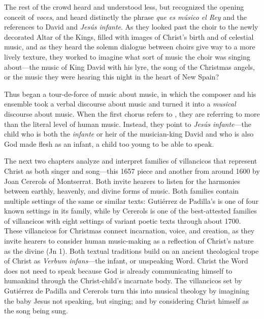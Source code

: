 The rest of the crowd heard and understood less, but recognized the opening
conceit of \emph{voces}, and heard distinctly the phrase \emph{que es músico el
Rey} and the references to David and \emph{Jesús infante}.
As they looked past the choir to the newly decorated Altar of the Kings, filled
with images of Christ's birth and of celestial music, and as they heard the
solemn dialogue between choirs give way to a more lively texture, they worked
to imagine what sort of music the choir was singing about---the music of King
David with his lyre, the song of the Christmas angels, or the music they were
hearing this night in the heart of New Spain?

Thus began a tour-de-force of music about music, in which the composer and his
ensemble took a verbal discourse about music and turned it into a
\emph{musical} discourse about music.
When the first chorus refers to , they are referring to
more than the literal level of human music.
Instead, they point to \emph{Jesús infante}---the child who is both the
\emph{infante} or heir of the musician-king David and who is also God made
flesh as an infant, a child too young to be able to speak.

The next two chapters analyze and interpret families of villancicos that
represent Christ as both singer and song---this 1657 piece and another from
around 1600 by Joan Cererols of Montserrat.
Both invite hearers to listen for the harmonies between earthly, heavenly, and
divine forms of music.
Both families contain multiple settings of the same or similar texts: Gutiérrez
de Padilla's  is one of four known settings in
its family, while  by Cererols
is one of the best-attested families of villancicos with eight settings of
variant poetic texts through about 1700.
These villancicos for Christmas connect incarnation, voice, and creation, as
they invite hearers to consider human music-making as a reflection of
Christ's nature as the divine  (Jn 1).
Both textual traditions build on an ancient theological trope of Christ as
\emph{Verbum infans}---the infant, or unspeaking Word.
Christ the Word does not need to speak because God is already communicating
himself to humankind through the Christ-child's incarnate body.
The villancicos set by Gutiérrez de Padilla and Cererols turn this into musical
theology by imagining the baby Jesus not speaking, but singing; and by
considering Christ himself as the song being sung.

